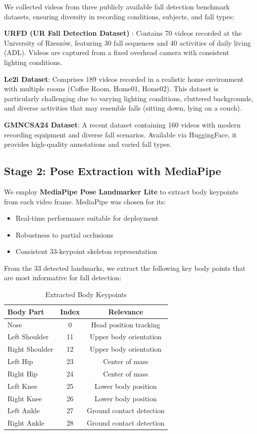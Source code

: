 \documentclass[conference]{IEEEtran}
\begin{document}
We collected videos from three publicly available fall detection benchmark datasets, ensuring diversity in recording conditions, subjects, and fall types:

\textbf{URFD (UR Fall Detection Dataset)} \cite{kwolek2014human}: Contains 70 videos recorded at the University of Rzeszów, featuring 30 fall sequences and 40 activities of daily living (ADL). Videos are captured from a fixed overhead camera with consistent lighting conditions.

\textbf{Le2i Dataset}: Comprises 189 videos recorded in a realistic home environment with multiple rooms (Coffee Room, Home01, Home02). This dataset is particularly challenging due to varying lighting conditions, cluttered backgrounds, and diverse activities that may resemble falls (sitting down, lying on a couch).

\textbf{GMNCSA24 Dataset}: A recent dataset containing 160 videos with modern recording equipment and diverse fall scenarios. Available via HuggingFace, it provides high-quality annotations and varied fall types.

\subsection{Stage 2: Pose Extraction with MediaPipe}

We employ \textbf{MediaPipe Pose Landmarker Lite} to extract body keypoints from each video frame. MediaPipe was chosen for its:
\begin{itemize}[leftmargin=*]
    \item Real-time performance suitable for deployment
    \item Robustness to partial occlusions
    \item Consistent 33-keypoint skeleton representation
\end{itemize}

From the 33 detected landmarks, we extract the following key body points that are most informative for fall detection:

\begin{table}[H]
\centering
\caption{Extracted Body Keypoints}
\label{tab:keypoints}
\begin{tabular}{lcc}
\toprule
\textbf{Body Part} & \textbf{Index} & \textbf{Relevance} \\
\midrule
Nose & 0 & Head position tracking \\
Left Shoulder & 11 & Upper body orientation \\
Right Shoulder & 12 & Upper body orientation \\
Left Hip & 23 & Center of mass \\
Right Hip & 24 & Center of mass \\
Left Knee & 25 & Lower body position \\
Right Knee & 26 & Lower body position \\
Left Ankle & 27 & Ground contact detection \\
Right Ankle & 28 & Ground contact detection \\
\bottomrule
\end{tabular}
\end{table}
\end{document}
